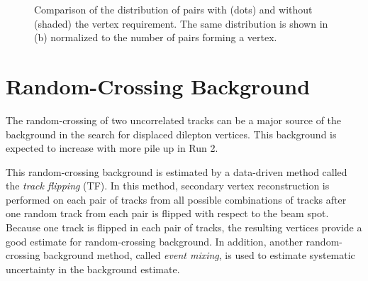 \begin{figure}[!htb]
    \centering
    \label{fig:cosmicCR} 
	\caption{Comparison of the \Rcr distribution of \mumu pairs with (dots) and without (shaded) the vertex requirement. The same distribution is shown in (b) normalized to the number of \mumu pairs forming a vertex.}
\end{figure}



\section{Random-Crossing Background}
\label{sec:bkg:random}

The random-crossing of two uncorrelated tracks can be a major source of the background in the search for displaced dilepton vertices. This background is expected to increase with more pile up in Run 2.
 
This random-crossing background is estimated by a data-driven method called the \textit{track flipping} (TF). In this method, secondary vertex reconstruction is performed on each pair of tracks from all possible combinations of tracks after one random track from each pair is flipped with respect to the beam spot. Because one track is flipped in each pair of tracks, the resulting vertices provide a good estimate for random-crossing background. In addition, another random-crossing background method, called \textit{event mixing}, is used to estimate systematic uncertainty in the background estimate.

